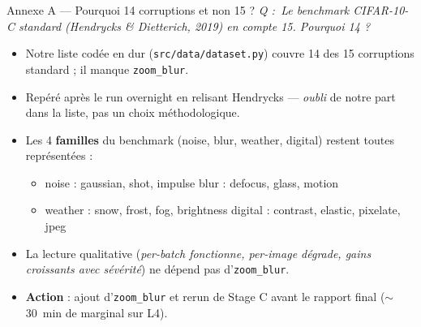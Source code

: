 \documentclass[10pt,aspectratio=169]{beamer}
\newcommand{\code}[1]{\texttt{\small #1}}
\newcommand{\qbox}[1]{\textit{\textcolor{accent}{Q : #1}}\par\smallskip}
\begin{document}
\begin{frame}{Annexe A --- Pourquoi 14 corruptions et non 15 ?}
  \qbox{\guillemotleft\,Le benchmark CIFAR-10-C standard (Hendrycks \& Dietterich, 2019) en compte 15. Pourquoi 14 ?\,\guillemotright{}}

  \begin{itemize}
    \item Notre liste codée en dur (\code{src/data/dataset.py}) couvre 14 des 15 corruptions standard ; il manque \alert{\code{zoom\_blur}}.
    \item Repéré après le run overnight en relisant Hendrycks --- \emph{oubli} de notre part dans la liste, pas un choix méthodologique.
    \item Les 4 \textbf{familles} du benchmark (noise, blur, weather, digital) restent toutes représentées :
    \begin{itemize}\small
      \item noise : gaussian, shot, impulse \quad blur : defocus, glass, motion
      \item weather : snow, frost, fog, brightness \quad digital : contrast, elastic, pixelate, jpeg
    \end{itemize}
    \item La lecture qualitative (\emph{per-batch fonctionne, per-image dégrade, gains croissants avec sévérité}) ne dépend pas d'\code{zoom\_blur}.
    \item \textbf{Action} : ajout d'\code{zoom\_blur} et rerun de Stage C avant le rapport final ($\sim$30~min de marginal sur L4).
  \end{itemize}
\end{frame}
\end{document}

